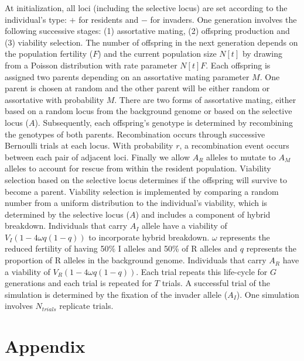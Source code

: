 \documentclass[a4paper,10pt]{article}
\begin{document}
At initialization, all loci (including the selective locus) are set according to the individual's type: $+$ for residents and $-$ for invaders. One generation involves the following successive stages: (1) assortative mating, (2) offspring production and (3) viability selection. The number of offspring in the next generation depends on the population fertility ($F$) and the current population size $N[t]$ by drawing from a Poisson distribution with rate parameter $N[t] F$. Each offspring is assigned two parents depending on an assortative mating parameter $M$. One parent is chosen at random and the other parent will be either random or assortative with probability $M$. There are two forms of assortative mating, either based on a random locus from the background genome or based on the selective locus ($A$). Subsequently, each offspring's genotype is determined by recombining the genotypes of both parents. Recombination occurs through successive Bernoulli trials at each locus. With probability $r$, a recombination event occurs between each pair of adjacent loci. Finally we allow $A_R$ alleles to mutate to $A_M$ alleles to account for rescue from within the resident population. Viability selection based on the selective locus determines if the offspring will survive to become a parent. Viability selection is implemented by comparing a random number from a uniform distribution to the individual's viability, which is determined by the selective locus ($A$) and includes a component of hybrid breakdown. Individuals that carry $A_I$ allele have a viability of $V_I (1 - 4 \omega q (1-q))$ to incorporate hybrid breakdown. $\omega$ represents the reduced fertility of having 50\% I alleles and 50\% of R alleles and $q$ represents the proportion of R alleles in the background genome. Individuals that carry $A_R$ have a viability of $V_R (1 - 4 \omega q (1-q))$. Each trial repeats this life-cycle for $G$ generations and each trial is repeated for $T$ trials. A successful trial of the simulation is determined by the fixation of the invader allele ($A_I$). One simulation involves $N_{trials}$ replicate trials. 

\section*{Appendix}
\end{document}
